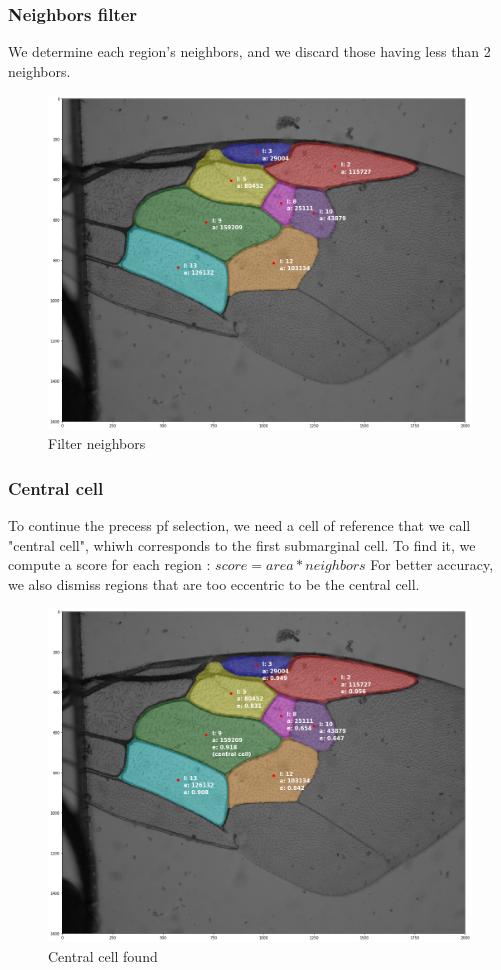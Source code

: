 \documentclass[a4paper]{article}
\begin{document}
\subsubsection{Neighbors filter}
We determine each region's neighbors, and we discard those having less than 2 neighbors. 


\begin{figure}[H]
    \centering
    \includegraphics[width=.6\textwidth]{figures/filter_neighbors.png}
    \caption{Filter neighbors}
\end{figure}

\subsubsection{Central cell}

To continue the precess pf selection, we need a cell of reference that we call "central cell", whiwh corresponds to the first submarginal cell. 
To find it, we compute a score for each region : $score = area * neighbors$
For better accuracy, we also dismiss regions that are too eccentric to be the central cell. 

\begin{figure}[H]
    \centering
    \includegraphics[width=.6\textwidth]{figures/central_cell.png}
    \caption{Central cell found}
    \label{central_cell}
\end{figure}
\end{document}
